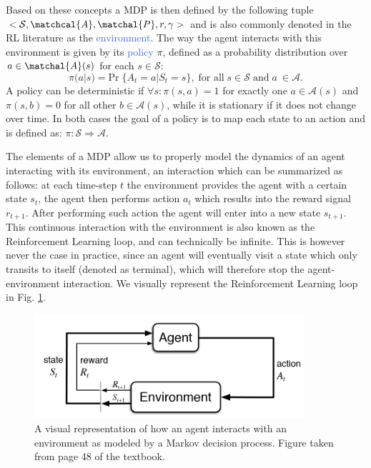 Based on these concepts a MDP is then defined by the following tuple $<\mathcal{S}, \matchcal{A}, \matchal{P}, r, \gamma>$ and is also commonly denoted in the RL literature as the \textcolor{RoyalBlue}{environment}. The way the agent interacts with this environment is given by its \textcolor{RoyalBlue}{policy} $\pi$, defined as a probability distribution over $a \in \matchal{A}(s)$ for each $s \in \mathcal{S}$:
\begin{equation}
	\pi(a|s) = \text{Pr}\; \{A_t = a | S_t = s\}, \; \text{for all}\; s \in \mathcal{S}\; \text{and}\; a\ \in \mathcal{A}. 
\end{equation}
A policy can be deterministic if $\forall s:\pi(s,a) = 1$ for exactly one $a \in \mathcal{A}(s)$ and $\pi(s,b)=0$ for all other $b \in \mathcal{A}(s)$, while it is stationary if it does not change over time. In both cases the goal of a policy is to map each state to an action and is defined as: $\pi:\mathcal{S}\Rightarrow\mathcal{A}$.

The elements of a MDP allow us to properly model the dynamics of an agent interacting with its environment, an interaction which can be summarized as follows: at each time-step $t$ the environment provides the agent with a certain state $s_t$, the agent then performs action $a_t$ which results into the reward signal $r_{t+1}$. After performing such action the agent will enter into a new state $s_{t+1}$. This continuous interaction with the environment is also known as the Reinforcement Learning loop, and can technically be infinite. This is however never the case in practice, since an agent will eventually visit a state which only transits to itself (denoted as terminal), which will therefore stop the agent-environment interaction. We visually represent the Reinforcement Learning loop in Fig. \ref{fig:rl_loop}.

\begin{figure}[ht!]
\centering
  \includegraphics[width=10cm]{./Images/Chapter06/rl_loop.png}
  \caption{A visual representation of how an agent interacts with an environment as modeled by a Markov decision process. Figure taken from page 48 of the \citet{sutton2018reinforcement} textbook.}
  \label{fig:rl_loop}
\end{figure}

